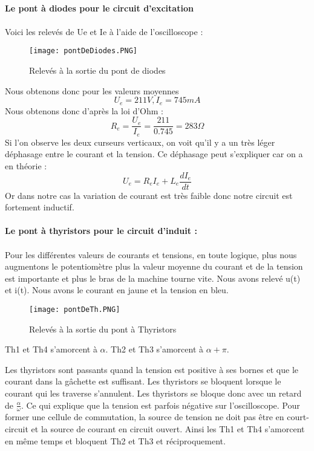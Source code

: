 \documentclass[oneside,a4paper,12pt]{article}
\begin{document}
	\paragraph{Le pont à diodes pour le circuit d'excitation}
	\paragraph{}
	
	Voici les relevés de Ue et Ie à l’aide de l'oscilloscope : 
	
	\begin{figure}[h]
		\centering
		\texttt{[image: pontDeDiodes.PNG]}
		\caption{Relevés à la sortie du pont de diodes}
	\end{figure}
	\newpage
	Nous obtenons donc pour les valeurs moyennes 
	$$ U_{e}=211 V, I_{e}=745 mA $$
	Nous obtenons donc d’après la loi d’Ohm : 
	$$ R_{e}=\frac{U_{e}}{I_{e}}=\frac{211}{0.745}=283\Omega $$
	Si l’on observe les deux curseurs verticaux, on voit qu’il y a un très léger déphasage entre le courant et la tension.
	Ce déphasage peut s’expliquer car on a en théorie :  
	$$ U_{e}=R_{e}I_{e}+L_{e}\frac{dI_{e}}{dt} $$
	Or dans notre cas la variation de courant est très faible donc notre circuit est fortement inductif.
	
	\paragraph{Le pont à thyristors pour le circuit d’induit :}
	\paragraph{}
	
	Pour les différentes valeurs de courants et tensions, en toute logique, plus nous augmentons le potentiomètre plus la valeur moyenne du courant et de la tension est importante et plus le bras de la machine tourne vite. 
	Nous avons relevé u(t) et i(t). Nous avons le courant en jaune et la tension en bleu. 
	
	\begin{figure}[h]
		\centering
		\texttt{[image: pontDeTh.PNG]}
		\caption{Relevés à la sortie du pont à Thyristors}
	\end{figure}

	Th1 et Th4 s’amorcent à $\alpha$. Th2 et Th3 s'amorcent à $\alpha+\pi$. 

	Les thyristors sont passants quand la tension est positive à ses bornes et que le courant dans la gâchette est suffisant.
	Les thyristors se bloquent lorsque le courant qui les traverse s’annulent. Les thyristors se bloque donc avec un retard de $\frac{\alpha}{\omega}$. Ce qui explique que la tension est parfois négative sur l'oscilloscope. Pour former une cellule de commutation, la source de tension ne doit pas être en court-circuit et la source de courant en circuit ouvert. Ainsi les Th1 et Th4 s’amorcent en même temps et bloquent Th2 et Th3 et réciproquement.
\end{document}

